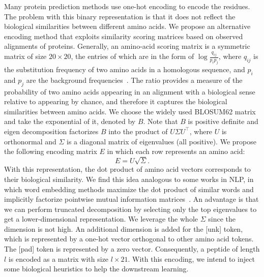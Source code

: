 \documentclass[runningheads]{llncs}
\begin{document}
Many protein prediction methods use one-hot encoding to encode the residues. The problem with this binary representation is that it does not reflect the biological similarities between different amino acids. We propose an alternative encoding method that exploits similarity scoring matrices based on observed alignments of proteins. Generally, an amino-acid scoring matrix is a symmetric matrix of size $20\times 20$, the entries of which are in the form of $\log\frac{q_{ij}}{p_ip_j}$, where $q_{ij}$ is the substitution frequency of two amino acids in a homologous sequence, and $p_i$ and $p_j$ are the background frequencies~\cite{pearson2013selecting}. The ratio provides a measure of the probability of two amino acids appearing in an alignment with a biological sense relative to appearing by chance, and therefore it captures the biological similarities between amino acids. We choose the widely used BLOSUM62 matrix and take the exponential of it, denoted by $B$. Note that $B$ is positive definite and eigen decomposition factorizes $B$ into the product of $U\Sigma U^\top$, where $U$ is orthonormal and $\Sigma$ is a diagonal matrix of eigenvalues (all positive). We propose the following encoding matrix $E$ in which each row represents an amino acid:
\begin{equation}
E=U\sqrt{\Sigma}.
\end{equation}
With this representation, the dot product of amino acid vectors corresponds to their biological similarity. We find this idea analogous to some works in NLP, in which word embedding methods maximize the dot product of similar words and implicitly factorize pointwise mutual information matrices~\cite{levy2014neural,mikolov2013distributed}. An advantage is that we can perform truncated decomposition by selecting only the top eigenvalues to get a lower-dimensional representation. We leverage the whole $\Sigma$ since the dimension is not high. An additional dimension is added for the [unk] token, which is represented by a one-hot vector orthogonal to other amino acid tokens. The [pad] token is represented by a zero vector. Consequently, a peptide of length $l$ is encoded as a matrix with size $l\times 21$. With this encoding, we intend to inject some biological heuristics to help the downstream learning.
\end{document}
